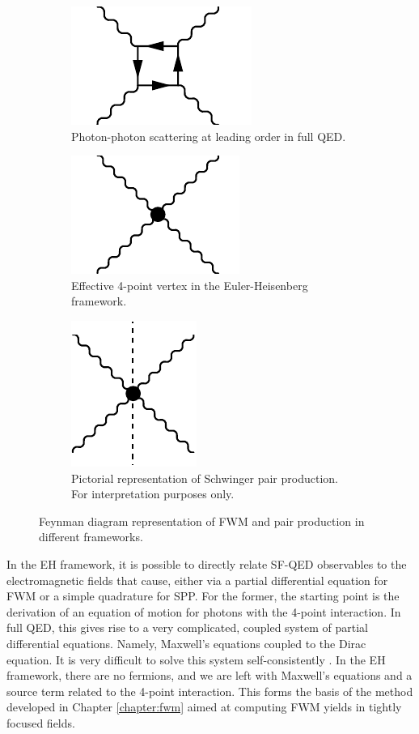 \documentclass[11pt,SymmetricalJury]{inrsthesis/inrsthesis}
\begin{document}
\begin{figure}
  \begin{subfigure}[t]{0.33\textwidth}
    \centering
    \includegraphics{figs/PhotonPhotonScattering.pdf}
    \caption{Photon-photon scattering at leading order in full QED.}
    \label{}
  \end{subfigure}
  \begin{subfigure}[t]{0.33\textwidth}
    \centering
    \includegraphics{figs/EulerHeisenberg.pdf}
    \caption{Effective 4-point vertex in the Euler-Heisenberg framework.}
    \label{}
  \end{subfigure}
  \begin{subfigure}[t]{0.33\textwidth}
    \centering
    \includegraphics{figs/SchwingerPairProduction.pdf}
    \caption{Pictorial representation of Schwinger pair production. For interpretation
             purposes only.}
    \label{}
  \end{subfigure}
  \caption{Feynman diagram representation of FWM and pair production in different
          frameworks.}
  \label{}
\end{figure}


In the EH framework, it is possible to directly relate SF-QED observables to the
electromagnetic fields that cause, either via a partial differential equation
for FWM or a simple quadrature for SPP. For the former, the starting point is
the derivation of an equation of motion for photons with the 4-point
interaction. In full QED, this gives rise to a very complicated, coupled system
of partial differential equations. Namely, Maxwell's equations coupled to the
Dirac equation. It is very difficult to solve this system self-consistently \cite{}.
In the EH framework, there are no fermions, and we are left with Maxwell's equations
and a source term related to the 4-point interaction. This forms the basis of the
method developed in Chapter \ref{chapter:fwm} aimed at computing FWM yields
in tightly focused fields.
\end{document}
